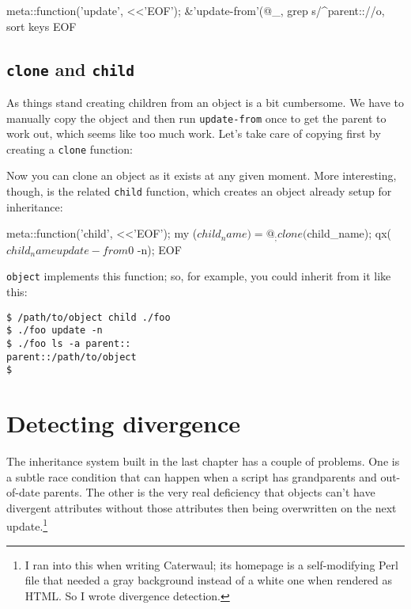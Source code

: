 \documentclass{report}
\begin{document}
\begin{perlcode}
meta::function('update', <<'EOF');
&{'update-from'}(@_, grep s/^parent:://o, sort keys %
EOF \end{perlcode}

\section{{\tt clone} and {\tt child}}\label{sec:cloning-and-inheritance-clone-and-child}
    As things stand creating children from an object is a bit cumbersome. We have to manually copy the object and then run {\tt update-from} once to get the parent to work out, which seems
    like too much work. Let's take care of copying first by creating a {\tt clone} function:


    Now you can clone an object as it exists at any given moment. More interesting, though, is the related {\tt child} function, which creates an object already setup for inheritance:

\begin{perlcode}
meta::function('child', <<'EOF');
my ($child_name) = @_;
clone($child_name);
qx($child_name update-from $0 -n);
EOF \end{perlcode}

    {\tt object} implements this function; so, for example, you could inherit from it like this:

\begin{verbatim}
$ /path/to/object child ./foo
$ ./foo update -n
$ ./foo ls -a parent::
parent::/path/to/object
$
\end{verbatim}
\chapter{Detecting divergence}\label{sec:detecting-divergence}
  The inheritance system built in the last chapter has a couple of problems. One is a subtle race condition that can happen when a script has grandparents and out-of-date parents. The other is
  the very real deficiency that objects can't have divergent attributes without those attributes then being overwritten on the next update.\footnote{I ran into this when writing Caterwaul; its
  homepage is a self-modifying Perl file that needed a gray background instead of a white one when rendered as HTML. So I wrote divergence detection.}
\end{document}
